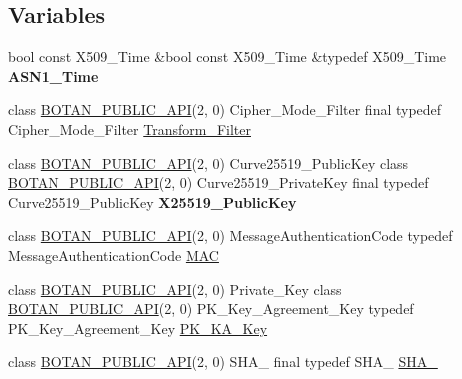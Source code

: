 \subsection*{Variables}
\begin{DoxyCompactItemize}
\item 
\mbox{\label{namespace_botan_a7ed1a645917b63520e98e9ab91aa021e}} 
bool const X509\+\_\+\+Time \&bool const X509\+\_\+\+Time \&typedef X509\+\_\+\+Time {\bfseries A\+S\+N1\+\_\+\+Time}
\item 
class \hyperlink{namespace_botan_a6b9388030d872e586a4655b776ac9501}{B\+O\+T\+A\+N\+\_\+\+P\+U\+B\+L\+I\+C\+\_\+\+A\+PI}(2, 0) Cipher\+\_\+\+Mode\+\_\+\+Filter final typedef Cipher\+\_\+\+Mode\+\_\+\+Filter \hyperlink{namespace_botan_a021ffc520728602cd2f027a40b68bc5f}{Transform\+\_\+\+Filter}
\item 
\mbox{\label{namespace_botan_a3375bcbe930557f2b1cd206c0f5cf43b}} 
class \hyperlink{namespace_botan_a6b9388030d872e586a4655b776ac9501}{B\+O\+T\+A\+N\+\_\+\+P\+U\+B\+L\+I\+C\+\_\+\+A\+PI}(2, 0) Curve25519\+\_\+\+Public\+Key class \hyperlink{namespace_botan_a6b9388030d872e586a4655b776ac9501}{B\+O\+T\+A\+N\+\_\+\+P\+U\+B\+L\+I\+C\+\_\+\+A\+PI}(2, 0) Curve25519\+\_\+\+Private\+Key final typedef Curve25519\+\_\+\+Public\+Key {\bfseries X25519\+\_\+\+Public\+Key}
\item 
class \hyperlink{namespace_botan_a6b9388030d872e586a4655b776ac9501}{B\+O\+T\+A\+N\+\_\+\+P\+U\+B\+L\+I\+C\+\_\+\+A\+PI}(2, 0) Message\+Authentication\+Code typedef Message\+Authentication\+Code \hyperlink{namespace_botan_aad9020384b0dc79f1bc8dcc59d5ee6fc}{M\+AC}
\item 
class \hyperlink{namespace_botan_a6b9388030d872e586a4655b776ac9501}{B\+O\+T\+A\+N\+\_\+\+P\+U\+B\+L\+I\+C\+\_\+\+A\+PI}(2, 0) Private\+\_\+\+Key class \hyperlink{namespace_botan_a6b9388030d872e586a4655b776ac9501}{B\+O\+T\+A\+N\+\_\+\+P\+U\+B\+L\+I\+C\+\_\+\+A\+PI}(2, 0) P\+K\+\_\+\+Key\+\_\+\+Agreement\+\_\+\+Key typedef P\+K\+\_\+\+Key\+\_\+\+Agreement\+\_\+\+Key \hyperlink{namespace_botan_a137fc6f2c61b1ee506513b92b09618c6}{P\+K\+\_\+\+K\+A\+\_\+\+Key}
\item 
class \hyperlink{namespace_botan_a6b9388030d872e586a4655b776ac9501}{B\+O\+T\+A\+N\+\_\+\+P\+U\+B\+L\+I\+C\+\_\+\+A\+PI}(2, 0) S\+H\+A\+\_ final typedef S\+H\+A\+\_ \hyperlink{namespace_botan_a7aedf36a60e3180255517925fa25efca}{S\+H\+A\+\_}
\item 

\end{DoxyCompactItemize}

